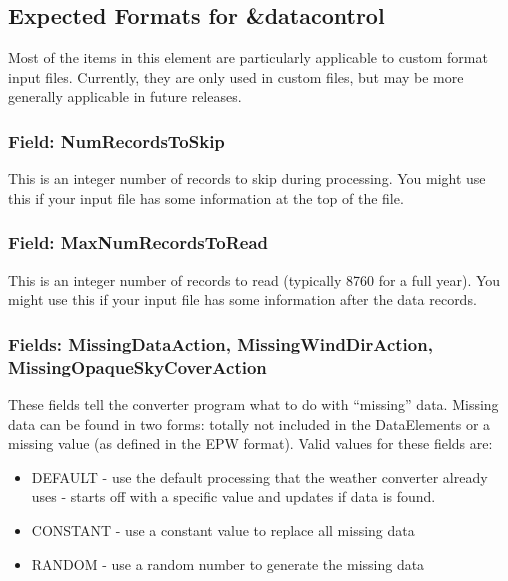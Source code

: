 \subsection{Expected Formats for \&datacontrol}\label{expected-formats-for-datacontrol}

Most of the items in this element are particularly applicable to custom format input files. Currently, they are only used in custom files, but may be more generally applicable in future releases.

\subsubsection{Field: NumRecordsToSkip}\label{field-numrecordstoskip}

This is an integer number of records to skip during processing. You might use this if your input file has some information at the top of the file.

\subsubsection{Field: MaxNumRecordsToRead}\label{field-maxnumrecordstoread}

This is an integer number of records to read (typically 8760 for a full year). You might use this if your input file has some information after the data records.

\subsubsection{Fields: MissingDataAction, MissingWindDirAction, MissingOpaqueSkyCoverAction}\label{fields-missingdataaction-missingwinddiraction-missingopaqueskycoveraction}

These fields tell the converter program what to do with ``missing'' data. Missing data can be found in two forms: totally not included in the DataElements or a missing value (as defined in the EPW format). Valid values for these fields are:

\begin{itemize}
\item
  DEFAULT - use the default processing that the weather converter already uses - starts off with a specific value and updates if data is found.
\item
  CONSTANT - use a constant value to replace all missing data
\item
  RANDOM - use a random number to generate the missing data
\end{itemize}

